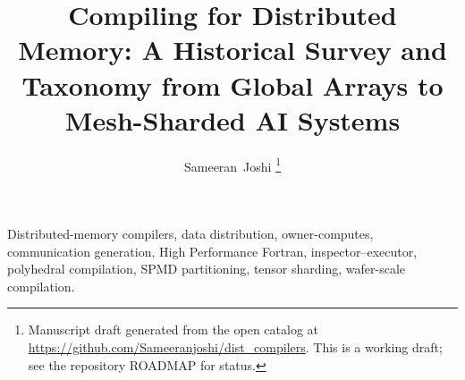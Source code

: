 \documentclass[journal]{IEEEtran}
\begin{document}
\title{Compiling for Distributed Memory: A Historical Survey and Taxonomy from Global Arrays to Mesh-Sharded AI Systems}

\author{Sameeran~Joshi%
\thanks{Manuscript draft generated from the open catalog at \url{https://github.com/Sameeranjoshi/dist_compilers}. This is a working draft; see the repository ROADMAP for status.}}


\maketitle



\begin{IEEEkeywords}
Distributed-memory compilers, data distribution, owner-computes, communication generation, High Performance Fortran, inspector--executor, polyhedral compilation, SPMD partitioning, tensor sharding, wafer-scale compilation.
\end{IEEEkeywords}


















\end{document}
